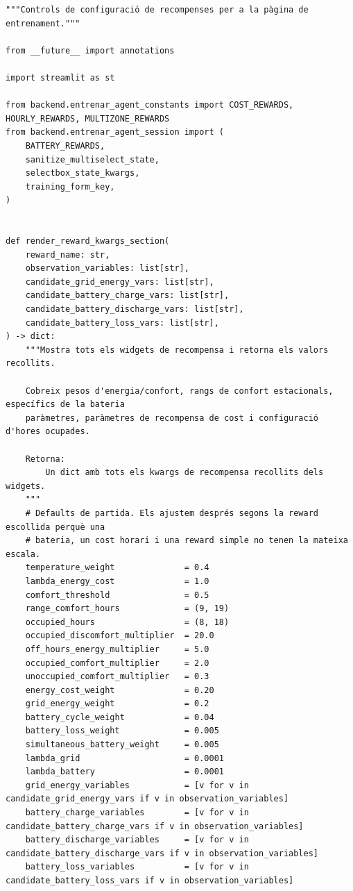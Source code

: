 \documentclass[10pt,a4paper]{article}
\begin{document}
\begin{lstlisting}[style=studioPython,caption={page\_components/training\_rewards.py},label={lst:page-components-training-rewards-py}]
"""Controls de configuració de recompenses per a la pàgina de entrenament."""

from __future__ import annotations

import streamlit as st

from backend.entrenar_agent_constants import COST_REWARDS, HOURLY_REWARDS, MULTIZONE_REWARDS
from backend.entrenar_agent_session import (
    BATTERY_REWARDS,
    sanitize_multiselect_state,
    selectbox_state_kwargs,
    training_form_key,
)


def render_reward_kwargs_section(
    reward_name: str,
    observation_variables: list[str],
    candidate_grid_energy_vars: list[str],
    candidate_battery_charge_vars: list[str],
    candidate_battery_discharge_vars: list[str],
    candidate_battery_loss_vars: list[str],
) -> dict:
    """Mostra tots els widgets de recompensa i retorna els valors recollits.

    Cobreix pesos d'energia/confort, rangs de confort estacionals, específics de la bateria
    paràmetres, paràmetres de recompensa de cost i configuració d'hores ocupades.

    Retorna:
        Un dict amb tots els kwargs de recompensa recollits dels widgets.
    """
    # Defaults de partida. Els ajustem després segons la reward escollida perquè una
    # bateria, un cost horari i una reward simple no tenen la mateixa escala.
    temperature_weight              = 0.4
    lambda_energy_cost              = 1.0
    comfort_threshold               = 0.5
    range_comfort_hours             = (9, 19)
    occupied_hours                  = (8, 18)
    occupied_discomfort_multiplier  = 20.0
    off_hours_energy_multiplier     = 5.0
    occupied_comfort_multiplier     = 2.0
    unoccupied_comfort_multiplier   = 0.3
    energy_cost_weight              = 0.20
    grid_energy_weight              = 0.2
    battery_cycle_weight            = 0.04
    battery_loss_weight             = 0.005
    simultaneous_battery_weight     = 0.005
    lambda_grid                     = 0.0001
    lambda_battery                  = 0.0001
    grid_energy_variables           = [v for v in candidate_grid_energy_vars if v in observation_variables]
    battery_charge_variables        = [v for v in candidate_battery_charge_vars if v in observation_variables]
    battery_discharge_variables     = [v for v in candidate_battery_discharge_vars if v in observation_variables]
    battery_loss_variables          = [v for v in candidate_battery_loss_vars if v in observation_variables]


\end{lstlisting}
\end{document}
